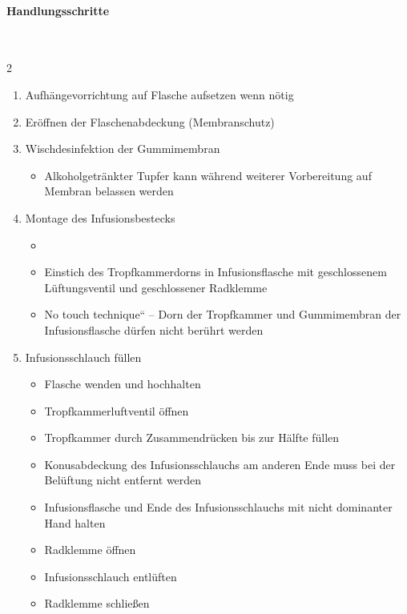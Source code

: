 \paragraph*{Handlungsschritte}~

\begin{multicols}{2}
\begin{enumerate}
    \item Aufhängevorrichtung auf Flasche aufsetzen wenn nötig
    \item Eröffnen der Flaschenabdeckung (Membranschutz)
    \item Wischdesinfektion der Gummimembran
    \begin{itemize}
        \item Alkoholgetränkter Tupfer kann während weiterer Vorbereitung
        auf Membran belassen werden
    \end{itemize}
    \item Montage des Infusionsbestecks
    \begin{itemize}
        \item {}
        \item Einstich des Tropfkammerdorns in Infusionsflasche mit
        geschlossenem Lüftungsventil und geschlossener Radklemme
        \item {\quotedblbase}No touch technique{\textquotedblleft} -- Dorn der
        Tropfkammer und Gummimembran der Infusionsflasche dürfen nicht
        berührt werden
    \end{itemize}
    \item Infusionsschlauch füllen
    \begin{itemize}
        \item Flasche wenden und hochhalten
        \item Tropfkammerluftventil öffnen
        \item Tropfkammer durch Zusammendrücken bis zur Hälfte füllen
        \item Konusabdeckung des Infusionsschlauchs am anderen Ende muss bei der
        Belüftung nicht entfernt werden
        \item Infusionsflasche und Ende des Infusionsschlauchs mit nicht
        dominanter Hand halten  
        \item Radklemme öffnen
        \item Infusionsschlauch entlüften
        \item Radklemme schließen
    \end{itemize}
\end{enumerate}
\end{multicols}


